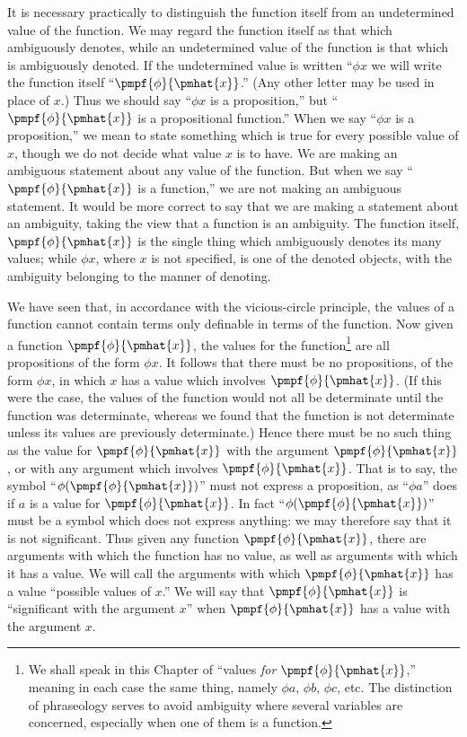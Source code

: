 \documentclass[letterpaper,12pt,openany,leqno]{book}
\newcommand{\pagefirst}[1]{\marginnote[\boxed{\text{#1}}]{\boxed{\text{#1}}}}
\begin{document}
It is necessary practically to distinguish the function itself from an undetermined value of the function. We may regard the function itself as that which ambiguously denotes, while an undetermined value of the function is that which is ambiguously denoted. If the undetermined value is written ``$\phi x$ we will write the function itself ``$\pmpf{\phi}{\pmhat{x}}$.'' (Any other letter may be used in place of $x$.) Thus we should say ``$\phi x$ is a proposition,'' but ``$\pmpf{\phi}{\pmhat{x}}$ is a propositional function.'' When we say ``$\phi x$ is a proposition,'' we mean to state something which is true for every possible value of $x$, though we do not decide what value $x$ is to have. We are making an ambiguous statement about any value of the function. But when we say ``$\pmpf{\phi}{\pmhat{x}}$ is a function,'' we are not making an ambiguous statement. It would be more correct to say that we are making a statement about an ambiguity, taking the view that a function is an ambiguity. The function itself, $\pmpf{\phi}{\pmhat{x}}$ is the single thing which ambiguously denotes its many values; while $\phi x$, where $x$ is not specified, is one of the denoted objects, with the ambiguity belonging to the manner of denoting.

We have seen that, in accordance with the vicious-circle principle, the values of a function cannot contain terms only definable in terms of the function. Now given a function $\pmpf{\phi}{\pmhat{x}}$, the values for the function\footnote{We shall speak in this Chapter of ``values \textit{for} $\pmpf{\phi}{\pmhat{x}}$,'' meaning in each case the same thing, namely $\phi a$, $\phi b$, $\phi c$, etc. The distinction of phraseology serves to avoid ambiguity where several variables are concerned, especially when one of them is a function.} are all pro\pagefirst{43}positions of the form $\phi x$. It follows that there must be no propositions, of the form $\phi x$, in which $x$ has a value which involves $\pmpf{\phi}{\pmhat{x}}$. (If this were the case, the values of the function would not all be determinate until the function was determinate, whereas we found that the function is not determinate unless its values are previously determinate.) Hence there must be no such thing as the value for $\pmpf{\phi}{\pmhat{x}}$ with the argument $\pmpf{\phi}{\pmhat{x}}$, or with any argument which involves $\pmpf{\phi}{\pmhat{x}}$. That is to say, the symbol ``$\phi(\pmpf{\phi}{\pmhat{x}})$'' must not express a proposition, as ``$\phi a$'' does if $a$ is a value for $\pmpf{\phi}{\pmhat{x}}$. In fact ``$\phi(\pmpf{\phi}{\pmhat{x}})$'' must be a symbol which does not express anything: we may therefore say that it is not significant. Thus given any function $\pmpf{\phi}{\pmhat{x}}$, there are arguments with which the function has no value, as well as arguments with which it has a value. We will call the arguments with which $\pmpf{\phi}{\pmhat{x}}$ has a value ``possible values of $x$.'' We will say that $\pmpf{\phi}{\pmhat{x}}$ is ``significant with the argument $x$'' when $\pmpf{\phi}{\pmhat{x}}$ has a value with the argument $x$.
\end{document}

